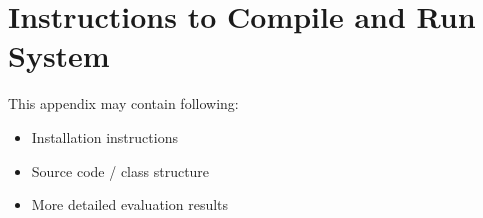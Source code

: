 

\chapter{Instructions to Compile and Run System}
\label{apx:instructions}

This appendix may contain following:
\begin{itemize}
    \item Installation instructions
    \item Source code / class structure
    \item More detailed evaluation results
\end{itemize}
